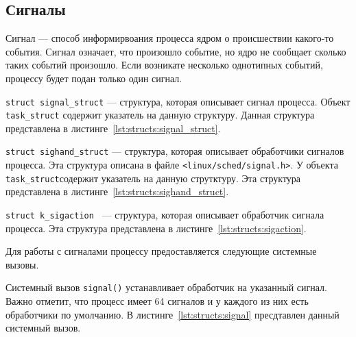 


\subsection{Сигналы}
Сигнал --- способ информирвоания процесса ядром о происшествии какого-то события. 
Сигнал означает, что произошло событие, но ядро не сообщает сколько таких событий произошло. 
Если возникате несколько однотипных событий, процессу будет подан только один сигнал.

\texttt{struct~signal\_struct} --- структура, которая описывает сигнал процесса. Объект \texttt{task\_struct} содержит указатель на данную структуру. Данная структура представлена в листинге~\ref{lst:structs:signal_struct}.

\clearpage



\texttt{struct sighand\_struct} --- структура, которая описывает обработчики сигналов процесса. 
Эта структура описана в файле \texttt{<linux/sched/signal.h>}.
У объекта \texttt{task\_struct}содержит указатель на данную струтктуру.
Эта структура представлена в листинге~\ref{lst:structs:sighand_struct}.

\texttt{struct k\_sigaction } --- структура, которая описывает обработчик сигнала процесса.
Эта структура представлена в листинге~\ref{lst:structs:sigaction}.

\clearpage





Для работы с сигналами процессу предоставляется следующие системные вызовы.

Системный вызов \texttt{signal()} устанавливает обработчик на указанный сигнал. Важно отметит, что процесс имеет 64 сигналов и у каждого из них есть обработчики по умолчанию. В листинге~\ref{lst:structs:signal} пресдтавлен данный системный вызов.

